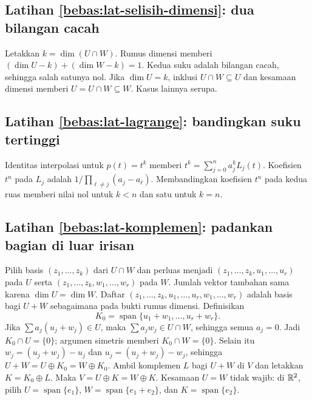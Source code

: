 \subsection*{Latihan \ref{bebas:lat-selisih-dimensi}: dua bilangan cacah}
Letakkan $k=\dim(U\cap W)$.
Rumus dimensi memberi $(\dim U-k)+(\dim W-k)=1$.
Kedua suku adalah bilangan cacah, sehingga salah satunya nol.
Jika $\dim U=k$, inklusi $U\cap W\subseteq U$ dan kesamaan
dimensi memberi $U=U\cap W\subseteq W$. Kasus lainnya serupa.

\subsection*{Latihan \ref{bebas:lat-lagrange}: bandingkan suku tertinggi}
Identitas interpolasi untuk $p(t)=t^k$ memberi
$t^k=\sum_{j=0}^n a_j^kL_j(t)$.
Koefisien $t^n$ pada $L_j$ adalah
$1/\prod_{\ell\ne j}(a_j-a_\ell)$.
Membandingkan koefisien $t^n$ pada kedua ruas memberi nilai
nol untuk $k<n$ dan satu untuk $k=n$.

\subsection*{Latihan \ref{bebas:lat-komplemen}: padankan bagian di luar irisan}
Pilih basis $(z_1,\ldots,z_k)$ dari $U\cap W$ dan perluas
menjadi $(z_1,\ldots,z_k,u_1,\ldots,u_r)$ pada $U$ serta
$(z_1,\ldots,z_k,w_1,\ldots,w_r)$ pada $W$.
Jumlah vektor tambahan sama karena $\dim U=\dim W$.
Daftar $(z_1,\ldots,z_k,u_1,\ldots,u_r,w_1,\ldots,w_r)$
adalah basis bagi $U+W$ sebagaimana pada bukti rumus dimensi.
Definisikan
\[
    K_0=\operatorname{span}\{u_1+w_1,\ldots,u_r+w_r\}.
\]
Jika $\sum a_j(u_j+w_j)\in U$, maka $\sum a_jw_j\in U\cap W$,
sehingga semua $a_j=0$. Jadi $K_0\cap U=\{0\}$; argumen
simetris memberi $K_0\cap W=\{0\}$.
Selain itu $w_j=(u_j+w_j)-u_j$ dan $u_j=(u_j+w_j)-w_j$,
sehingga $U+W=U\oplus K_0=W\oplus K_0$.
Ambil komplemen $L$ bagi $U+W$ di $V$ dan letakkan $K=K_0\oplus L$.
Maka $V=U\oplus K=W\oplus K$.
Kesamaan $U=W$ tidak wajib: di $\mathbb{R}^2$, pilih
$U=\operatorname{span}\{e_1\}$,
$W=\operatorname{span}\{e_1+e_2\}$, dan $K=\operatorname{span}\{e_2\}$.
\fi
